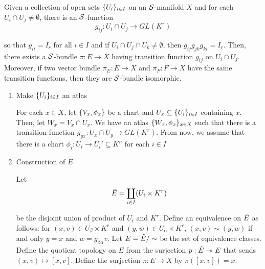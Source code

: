 \begin{remark}
	Given a collection of open sets $\{U_i\}_{i \in I}$ on an $\mathcal{S}$-manifold $X$ and for each $U_i \cap U_j \neq \emptyset$, there is an $\mathcal{S}$-function
	$$
	g_{ij}: U_i \cap U_j \to GL(K^r)
	$$
	
	so that $g_{ii} = I_r$ for all $i \in I$ and if $U_i \cap U_j \cap U_k \neq \emptyset$, then $g_{ij} g_{jk} g_{ki} = I_r$. Then, there exists a $\mathcal{S}$-bundle $\pi: E \to X$ having transition function $g_{ij}$ on $U_i \cap U_j$. Moreover, if two vector bundle $\pi_E: E \to X$ and $\pi_F: F \to X$ have the same transition functions, then they are $\mathcal{S}$-bundle isomorphic.
	
	\begin{longproof}
		\begin{enumerate}
			
			\item Make $\{U_i\}_{i \in I}$ an atlas
			
			For each $x \in X$, let $\{V_x, \phi_x\}$ be a chart and $U_x \subseteq \{U_i\}_{i \in I}$ containing $x$. Then, let $W_x = V_x \cap U_x$.  We have an atlas $\{W_x, \phi_x\}_{x \in X}$ such that there is a transition function $g_{yx}: U_x \cap U_y \to GL(K^r)$. From now, we assume that there is a chart $\phi_i: U_i \to U_i' \subseteq K^n$ for each $i \in I$
			
			\item Construction of $E$
			
			
			Let
			$$
			\Tilde{E} = \coprod_{i \in I} (U_i \times K^r)
			$$
			
			be the disjoint union of product of $U_i$ and $K^r$. Define an equivalence on $\Tilde{E}$ as follows: for $(x, v) \in U_\beta \times K^r$ and $(y, w) \in U_\alpha \times K^r$, $(x, v) \sim (y, w)$ if and only $y = x$ and $w = g_{\beta \alpha} v$. Let $E = \Tilde{E} / \sim$ be the set of equivalence classes. Define the quotient topology on $E$ from the surjection $p: \Tilde{E} \twoheadrightarrow E$ that sends $(x, v) \mapsto [x, v]$. Define the surjection $\pi: E \to X$ by $\pi([x, v]) = x$.
			\begin{center}
			\end{center}
			

\end{enumerate}
\end{longproof}
\end{remark}
